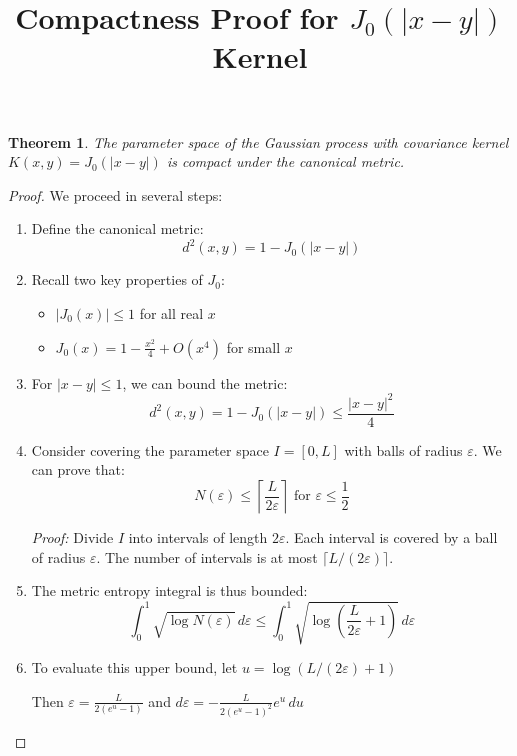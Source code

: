 \documentclass{article}
\title{Compactness Proof for $J_0(|x - y|)$ Kernel}
\author{}
\date{}
\newtheorem{theorem}{Theorem}
\begin{document}
\maketitle

\begin{theorem}
The parameter space of the Gaussian process with covariance kernel $K(x,y) = J_0(|x-y|)$ is compact under the canonical metric.
\end{theorem}

\begin{proof}
We proceed in several steps:

\begin{enumerate}
    \item Define the canonical metric:
    \[d^2(x,y) = 1 - J_0(|x-y|)\]
    
    \item Recall two key properties of $J_0$:
    \begin{itemize}
        \item $|J_0(x)| \leq 1$ for all real $x$
        \item $J_0(x) = 1 - \frac{x^2}{4} + O(x^4)$ for small $x$
    \end{itemize}
    
    \item For $|x-y| \leq 1$, we can bound the metric:
    \[d^2(x,y) = 1 - J_0(|x-y|) \leq \frac{|x-y|^2}{4}\]
    
    \item Consider covering the parameter space $I = [0,L]$ with balls of radius $\varepsilon$. We can prove that:
    \[N(\varepsilon) \leq \left\lceil\frac{L}{2\varepsilon}\right\rceil \text{ for } \varepsilon \leq \frac{1}{2}\]
    
    \textit{Proof:} Divide $I$ into intervals of length $2\varepsilon$. Each interval is covered by a ball of radius $\varepsilon$. The number of intervals is at most $\lceil L / (2\varepsilon) \rceil$.
    
    \item The metric entropy integral is thus bounded:
    \[\int_0^1 \sqrt{\log N(\varepsilon)} \,d\varepsilon \leq \int_0^1 \sqrt{\log\left(\frac{L}{2\varepsilon} + 1\right)} \,d\varepsilon\]
    
    \item To evaluate this upper bound, let $u = \log(L/(2\varepsilon) + 1)$
    
    Then $\varepsilon = \frac{L}{2(e^u - 1)}$ and $d\varepsilon = -\frac{L}{2(e^u - 1)^2} e^u \,du$
    

\end{enumerate}
\end{proof}
\end{document}
